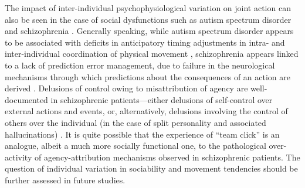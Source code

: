 \begin{CJK}{UTF8}{gbsn}
  The impact of inter-individual psychophysiological variation on joint action can also be seen in the case of social dysfunctions such as autism spectrum disorder \citep{Isenhower2012} and schizophrenia \citep{Varlet2012}.  Generally speaking,  while autism spectrum disorder appears to be associated with deficits in anticipatory timing adjustments in intra- and inter-individual coordination of physical movement \citep{Martineau2010}, schizophrenia appears linked to a lack of prediction error management, due to failure in the neurological mechanisms through which predictions about the consequences of an action are derived \citep{Frith2000}.  Delusions of control owing to misattribution of agency are well-documented in schizophrenic patients---either delusions of self-control over external actions and events, or, alternatively, delusions involving the control of others over the individual (in the case of split personality and associated hallucinations) \citep{Frith2007}. It is quite possible that the experience of ``team click'' is an analogue, albeit a much more socially functional one, to the pathological over-activity of agency-attribution mechanisms observed in schizophrenic patients.  The question of individual variation in sociability and movement tendencies should be further assessed in future studies.


\end{CJK}
